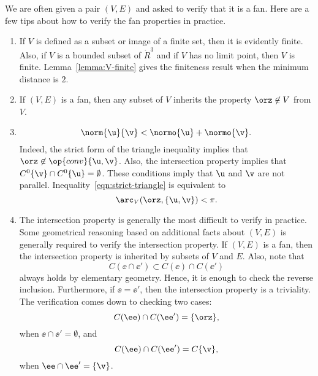 \begin{remark}\label{remark:fan-verify}  
We are often given a pair $(V,E)$ and asked to verify
that it is a fan.  Here are a few tips about how to verify the fan
properties in practice.
\begin{enumerate} 
\item {} If $V$ is defined as a subset or image of a
finite set, then it is evidently finite.  Also, if $V$ is a bounded
subset of $\ring{R}^3$ and if $V$ has no limit point,  then $V$ is finite.
Lemma~\ref{lemma:V-finite} gives the finiteness result when the
minimum distance is $2$.\vspace{6pt}
\item {} If $(V,E)$ is a fan, then any subset of $V$
inherits the property $\orz\not\in V$ from $V$.  \vspace{6pt}
\item {} 
\begin{equation}\label{eqn:strict-triangle}
\norm{\u}{\v} < \normo{\u} + \normo{\v}.
\end{equation}
Indeed, the strict form of the triangle inequality implies that
$\orz\not\in \op{conv}\{\u,\v\}$.  Also, the intersection property
implies that $C^0\{\v\} \cap C^0\{\u\} = \emptyset$.  These conditions
imply that $\u$ and $\v$ are not parallel.  Inequality~\eqref{eqn:strict-triangle}
is equivalent to
\[ 
\arc_V(\orz,\{\u,\v\}) < \pi.
\] 
\item {} The intersection property is generally the
most difficult to verify in practice.  Some geometrical reasoning
based on additional facts about $(V,E)$ is generally required to
verify the intersection property.  If $(V,E)$ is a fan, then the
intersection property is inherited by subsets of $V$ and $E$.  Also,
note that
\[ 
C(\ee\cap \ee') \subset C(\ee) \cap C(\ee')
\] 
always holds by elementary geometry.  Hence, it is enough to check the
reverse inclusion.  Furthermore, if $\ee = \ee'$, then the
intersection property is a triviality.  The verification comes down to
checking two cases:
\[ 
C(\ee) \cap C(\ee') = \{\orz\},
\] 
when $\ee\cap \ee' = \emptyset$, and
\[ 
C(\ee)\cap C(\ee') = C\{\v\},
\] 
when $\ee\cap \ee' = \{\v\}$.
\end{enumerate}
\end{remark}


